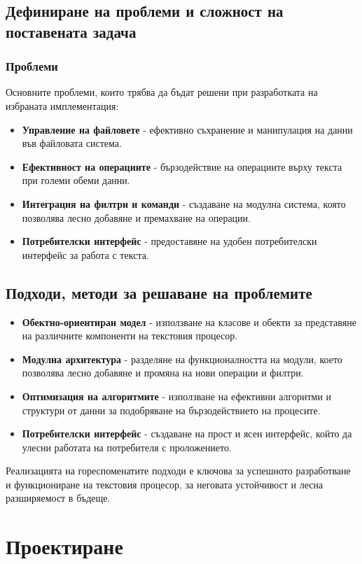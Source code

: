\documentclass[a4paper,12pt]{article}
\begin{document}
\subsection{Дефиниране на проблеми и сложност на поставената задача}
\subsubsection{Проблеми}
Основните проблеми, които трябва да бъдат решени при разработката на избраната имплементация:
\begin{itemize}
    \item \textbf{Управление на файловете} - ефективно съхранение и манипулация на данни във файловата система.
    \item \textbf{Ефективност на операциите} - бързодействие на операциите върху текста при големи обеми данни.
    \item \textbf{Интеграция на филтри и команди} - създаване на модулна система, която позволява лесно добавяне и премахване на операции.
    \item \textbf{Потребителски интерфейс} - предоставяне на удобен потребителски интерфейс за работа с текста.
\end{itemize}

\subsection{Подходи, методи за решаване на проблемите}
\begin{itemize}
\item \textbf{Обектно-ориентиран модел} - използване на класове и обекти за представяне на различните компоненти на текстовия процесор.
    \item \textbf{Модулна архитектура} - разделяне на функционалността на модули, което позволява лесно добавяне и промяна на нови операции и филтри.
    \item \textbf{Оптимизация на алгоритмите} - използване на ефективни алгоритми и структури от данни за подобряване на бързодействието на процесите.
    \item \textbf{Потребителски интерфейс} - създаване на прост и ясен интерфейс, който да улесни работата на потребителя с проложението.
\end{itemize}
    Реализацията на гореспоменатите подходи е ключова за успешното разработване и функциониране на текстовия процесор, за неговата устойчивост и лесна разширяемост в бъдеще.

\section{Проектиране}
\end{document}
